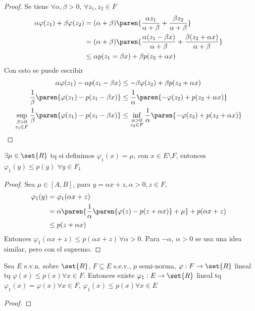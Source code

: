 \documentclass{notetaking}
\begin{document}
\begin{proof}
    Se tiene \(\forall\alpha,\beta>0\), \(\forall z_1,z_2\in F\)
    \begin{align*}
        \alpha\varphi(z_1)+\beta\varphi(z_2) &= (\alpha+\beta)\paren{\frac{\alpha z_1}{\alpha+\beta}+\frac{\beta z_2}{\alpha+\beta}}\\
        &= (\alpha+\beta)\paren{\frac{\alpha (z_1-\beta x)}{\alpha+\beta}+\frac{\beta (z_2+\alpha x)}{\alpha+\beta}}\\
        &\leq \alpha p(z_1=\beta x)+\beta p(z_2+\alpha x)
    \end{align*}
    Con esto se puede escribir
    \begin{align*}
        \alpha\varphi(z_1)-\alpha p(z_1-\beta x)&\leq-\beta\varphi(z_2)+\beta p(z_2+\alpha x)\\
        \frac1\beta\paren{\varphi(z_1)-p(z_1-\beta x)}&\leq\frac1\alpha\paren{-\varphi(z_2)+ p(z_2+\alpha x)}\\
        \sup_{\substack{\beta>0\\z_1\in F}}\frac1\beta\paren{\varphi(z_1)-p(z_1-\beta x)}&\leq\inf_{\substack{\alpha>0\\z_2\in F}}\frac1\alpha\paren{-\varphi(z_2)+ p(z_2+\alpha x)}
    \end{align*}
\end{proof}
\begin{cor}
    \(\exists\mu\in\set{R}\) tq si definimos \(\varphi_1(x)=\mu\), con \(x\in E\setminus F\), entonces \(\varphi_1(y)\leq p(y)\) \(\forall y\in F_1\)
\end{cor}
\begin{proof}
    Sea \(\mu\in[A,B]\), para \(y=\alpha x+z,\alpha>0,z\in F\),
    \begin{align*}
        \varphi_1(y)&=\varphi_1(\alpha x+z)\\
        &=\alpha\paren{\frac1\alpha\paren{\varphi(z)-p(z+\alpha x)}+\mu}+p(\alpha x+z)\\
        &\leq p(z+\alpha x)
    \end{align*}
    Entonces \(\varphi_1(\alpha x+z)\leq p(\alpha x+z)\, \forall \alpha>0\). Para \(-\alpha\), \(\alpha>0\) se usa una idea similar, pero con el supremo.
\end{proof}

\begin{thm}
    Sea \(E\) e.v.n. sobre \(\set{R}\), \(F\subseteq E\) s.e.v., \(p\) semi-norma, \(\varphi:F\rightarrow\set{R}\) lineal tq \(\varphi(x)\leq p(x)\forall x\in F\). Entonces existe \(\varphi_1:E\rightarrow\set{R}\) lineal tq \(\varphi_1(x)=\varphi(x)\forall x\in F\), \(\varphi_1(x)\leq p(x)\forall x\in E\)
\end{thm}
\begin{proof}
    
\end{proof}
\end{document}
